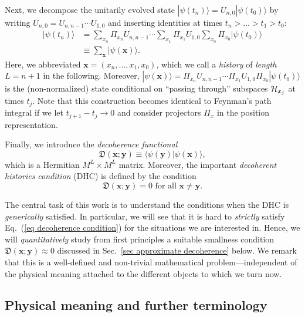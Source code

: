 \documentclass[pre,twocolumn,10pt,aps,longbibliography,nofootinbib]{revtex4-1}
\newcommand{\C}[1]{{\cal{#1}}}
\newcommand{\bb}[1]{\textbf{#1}}
\newcommand{\mf}[1]{{\mathfrak{#1}}}
\newcommand{\lr}[1]{{\langle {#1}\rangle}}
\newcommand{\new}[1]{#1}
\begin{document}
Next, we decompose the unitarily evolved state $|\psi(t_n)\rangle = U_{n,0}|\psi(t_0)\rangle$ by writing $U_{n,0} = U_{n,n-1}\cdots U_{1,0}$ and inserting identities at times $t_n > \dots > t_1 > t_0$:
\begin{align}
 |\psi(t_n)\rangle
 &= \sum_{x_n}\Pi_{x_n} U_{n,n-1}\cdots\sum_{x_1}\Pi_{x_1}U_{1,0}\sum_{x_0}\Pi_{x_0}|\psi(t_0)\rangle \nonumber \\
 &\equiv \sum_{\bb x}|\psi(\bb x)\rangle. \label{eq psi tot}
\end{align}
Here, we abbreviated $\bb x = (x_n,\dots,x_1,x_0)$, which we call a \emph{history} of \emph{length} $L=n+1$ in the following. Moreover, $|\psi(\bb x)\rangle = \Pi_{x_n} U_{n,n-1}\cdots\Pi_{x_1}U_{1,0}\Pi_{x_0}|\psi(t_0)\rangle$ is the (non-normalized) state conditional on ``passing through'' subspaces $\C H_{x_j}$ at times $t_j$. Note that this construction becomes identical to Feynman's path integral if we let $t_{j+1}-t_j\rightarrow0$ and consider projectors $\Pi_x$ in the position representation.

Finally, we introduce the \emph{decoherence functional}
\begin{equation}\label{eq decoherence functional}
 \mf{D}(\bb x;\bb y) \equiv \lr{\psi(\bb y)|\psi(\bb x)},
\end{equation}
which is a Hermitian $M^L\times M^L$ matrix. Moreover, the important \emph{decoherent histories condition} (DHC) is defined by the condition
\begin{equation}\label{eq decoherence condition}
 \mf{D}(\bb x;\bb y) = 0 \text{ for all } \bb x\neq\bb y.
\end{equation}

The central task of this work is to understand the conditions when the DHC is \emph{generically} satisfied. In particular, we will see that it is hard to \emph{strictly} satisfy Eq.~(\ref{eq decoherence condition}) for the situations we are interested in. Hence, we will \emph{quantitatively} study from first principles a suitable smallness condition $\mf{D}(\bb x;\bb y) \approx 0$ discussed in Sec.~\ref{sec approximate decoherence} below. We remark that this is a well-defined and non-trivial mathematical problem---independent of the physical meaning attached to the different objects to which we turn now.

\subsection{\new{Physical meaning and further terminology}}
\end{document}

